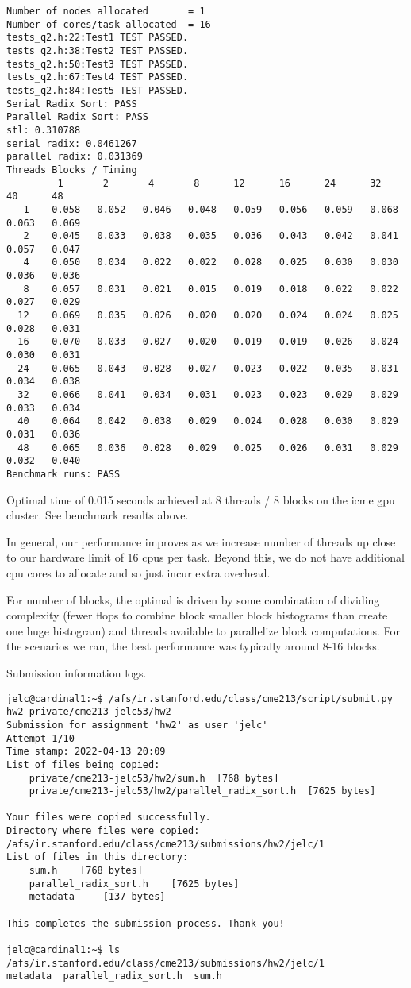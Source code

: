 \documentclass[12pt,letterpaper,twoside]{article}
\begin{document}
\begin{itemize}
\begin{verbatim}
Number of nodes allocated		= 1
Number of cores/task allocated 	= 16
tests_q2.h:22:Test1	TEST PASSED.
tests_q2.h:38:Test2	TEST PASSED.
tests_q2.h:50:Test3	TEST PASSED.
tests_q2.h:67:Test4	TEST PASSED.
tests_q2.h:84:Test5	TEST PASSED.
Serial Radix Sort: PASS
Parallel Radix Sort: PASS
stl: 0.310788
serial radix: 0.0461267
parallel radix: 0.031369
Threads Blocks / Timing
         1       2       4       8      12      16      24      32      40      48
   1    0.058   0.052   0.046   0.048   0.059   0.056   0.059   0.068   0.063   0.069
   2    0.045   0.033   0.038   0.035   0.036   0.043   0.042   0.041   0.057   0.047
   4    0.050   0.034   0.022   0.022   0.028   0.025   0.030   0.030   0.036   0.036
   8    0.057   0.031   0.021   0.015   0.019   0.018   0.022   0.022   0.027   0.029
  12    0.069   0.035   0.026   0.020   0.020   0.024   0.024   0.025   0.028   0.031
  16    0.070   0.033   0.027   0.020   0.019   0.019   0.026   0.024   0.030   0.031
  24    0.065   0.043   0.028   0.027   0.023   0.022   0.035   0.031   0.034   0.038
  32    0.066   0.041   0.034   0.031   0.023   0.023   0.029   0.029   0.033   0.034
  40    0.064   0.042   0.038   0.029   0.024   0.028   0.030   0.029   0.031   0.036
  48    0.065   0.036   0.028   0.029   0.025   0.026   0.031   0.029   0.032   0.040
Benchmark runs: PASS
\end{verbatim} 
    
    Optimal time of 0.015 seconds achieved at 8 threads / 8 blocks on the icme gpu cluster.
    See benchmark results above.

    In general, our performance improves as we increase number of threads up close to our 
    hardware limit of 16 cpus per task. Beyond this, we do not have additional cpu cores to 
    allocate and so just incur extra overhead.
    
    For number of blocks, the optimal is driven by some combination of dividing complexity 
    (fewer flops to combine block smaller block histograms than create one huge histogram)
    and threads available to parallelize block computations. For the scenarios we ran,
    the best performance was typically around 8-16 blocks.

\end{itemize}


Submission information logs.
\begin{verbatim}
jelc@cardinal1:~$ /afs/ir.stanford.edu/class/cme213/script/submit.py hw2 private/cme213-jelc53/hw2
Submission for assignment 'hw2' as user 'jelc'
Attempt 1/10
Time stamp: 2022-04-13 20:09
List of files being copied:
    private/cme213-jelc53/hw2/sum.h	 [768 bytes]
    private/cme213-jelc53/hw2/parallel_radix_sort.h	 [7625 bytes]

Your files were copied successfully.
Directory where files were copied: /afs/ir.stanford.edu/class/cme213/submissions/hw2/jelc/1
List of files in this directory:
    sum.h	 [768 bytes]
    parallel_radix_sort.h	 [7625 bytes]
    metadata	 [137 bytes]

This completes the submission process. Thank you!

jelc@cardinal1:~$ ls /afs/ir.stanford.edu/class/cme213/submissions/hw2/jelc/1
metadata  parallel_radix_sort.h  sum.h
\end{verbatim}
\end{document}
